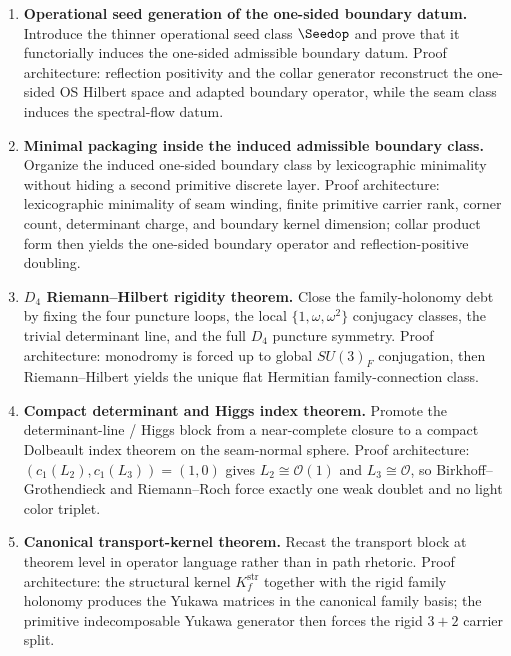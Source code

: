 \begin{tcolorbox}[colback=tfptblue!2, colframe=tfptblue!40, breakable,
    title={Version 4.5 completion surface}, colbacktitle=tfptblue!60]
\begin{enumerate}[leftmargin=1.5em, topsep=3pt, itemsep=4pt]
    \item \textbf{ Operational seed generation of the one-sided boundary datum.} Introduce the thinner operational seed class $\Seedop$ and prove that it functorially induces the one-sided admissible boundary datum. Proof architecture: reflection positivity and the collar generator reconstruct the one-sided OS Hilbert space and adapted boundary operator, while the seam class induces the spectral-flow datum.
    \item \textbf{ Minimal packaging inside the induced admissible boundary class.} Organize the induced one-sided boundary class by lexicographic minimality without hiding a second primitive discrete layer. Proof architecture: lexicographic minimality of seam winding, finite primitive carrier rank, corner count, determinant charge, and boundary kernel dimension; collar product form then yields the one-sided boundary operator and reflection-positive doubling.
    \item \textbf{ $D_4$ Riemann--Hilbert rigidity theorem.} Close the family-holonomy debt by fixing the four puncture loops, the local $\{1,\omega,\omega^2\}$ conjugacy classes, the trivial determinant line, and the full $D_4$ puncture symmetry. Proof architecture: monodromy is forced up to global $SU(3)_F$ conjugation, then Riemann--Hilbert yields the unique flat Hermitian family-connection class.
    \item \textbf{ Compact determinant and Higgs index theorem.} Promote the determinant-line / Higgs block from a near-complete closure to a compact Dolbeault index theorem on the seam-normal sphere. Proof architecture: $(c_1(L_2),c_1(L_3))=(1,0)$ gives $L_2\cong\mathcal O(1)$ and $L_3\cong\mathcal O$, so Birkhoff--Grothendieck and Riemann--Roch force exactly one weak doublet and no light color triplet.
    \item \textbf{ Canonical transport-kernel theorem.} Recast the transport block at theorem level in operator language rather than in path rhetoric. Proof architecture: the structural kernel $K_f^{\mathrm{str}}$ together with the rigid family holonomy produces the Yukawa matrices in the canonical family basis; the primitive indecomposable Yukawa generator then forces the rigid $3+2$ carrier split.

\end{enumerate}
\end{tcolorbox}
